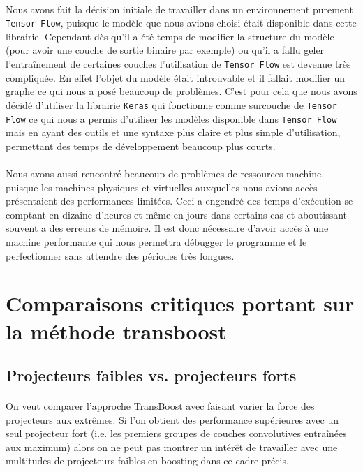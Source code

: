 \documentclass[11 pt]{article}
\begin{document}
\paragraph{}Nous avons fait la décision initiale de travailler dans un environnement purement \texttt{Tensor Flow}, puisque le modèle que nous avions choisi était disponible dans cette librairie. Cependant dès qu’il a été temps de modifier la structure du modèle (pour avoir une couche de sortie binaire par exemple) ou qu’il a fallu geler l'entraînement de certaines couches l’utilisation de \texttt{Tensor Flow} est devenue très compliquée. En effet l’objet du modèle était introuvable et il fallait modifier un graphe ce qui nous a posé beaucoup de problèmes. C’est pour cela que nous avons décidé d’utiliser la librairie \texttt{Keras} qui fonctionne comme surcouche de \texttt{Tensor Flow} ce qui nous a permis d’utiliser les modèles disponible dans \texttt{Tensor Flow} mais en ayant des outils et une syntaxe plus claire et plus simple d’utilisation, permettant des temps de développement beaucoup plus courts.

\paragraph{}Nous avons aussi rencontré beaucoup de problèmes de ressources machine, puisque les machines physiques et virtuelles auxquelles nous avions accès présentaient des performances limitées. Ceci a engendré des temps d'exécution se comptant en dizaine d’heures et même en jours dans certains cas et aboutissant souvent a des erreurs de mémoire. Il est donc nécessaire d’avoir accès à une machine performante qui nous permettra débugger le programme et le perfectionner sans attendre des périodes très longues.

\section{Comparaisons critiques portant sur la méthode transboost}
\subsection{Projecteurs faibles vs. projecteurs forts}
\paragraph{}On veut comparer l’approche TransBoost avec faisant varier la force des projecteurs aux extrêmes. Si l’on obtient des performance supérieures avec un seul projecteur fort (i.e. les premiers groupes de couches convolutives entraînées aux maximum) alors on ne peut pas montrer un intérêt de travailler avec une multitudes de projecteurs faibles en boosting dans ce cadre précis.
\end{document}
